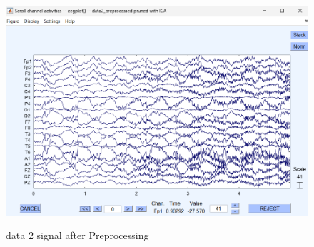 \documentclass[11pt]{article}
\begin{document}
\begin{figure}[H]
    \begin{center}
        \includegraphics[scale=0.55]{Fig/channel_activity_data2.png}
        \label{fig:data2Activity}
        \caption{data 2 signal after Preprocessing}
    \end{center}
\end{figure}
\end{document}
